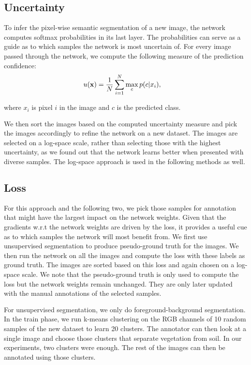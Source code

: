 \documentclass[letterpaper, 10 pt, conference]{ieeeconf}  %
\begin{document}
\subsection{Uncertainty}

To infer the pixel-wise semantic segmentation of a new image, the network computes softmax probabilities in its last layer. The probabilities can serve as a guide as to which samples the network is most uncertain of. For every image passed through the network, we compute the following measure of the prediction confidence:
\begin{align}
u(\bold{x}) &= \frac{1}{N} \sum_{i=1}^N \max_c p(c|x_i),
\end{align}  

where $x_i$ is pixel $i$ in the image and $c$ is the predicted class.

We then sort the images based on the computed uncertainty measure and pick the images accordingly to refine the network on a new dataset. The images are selected on a log-space scale, rather than selecting those with the highest uncertainty, as we found out that the network learns better when presented with diverse samples. The log-space approach is used in the following methods as well.

\subsection{Loss} \label{sec:loss}

For this approach and the following two, we pick those samples for annotation that might have the largest impact on the network weights. Given that the gradients w.r.t the network weights are driven by the loss, it provides a useful cue as to which samples the network will most benefit from. We first use unsupervised segmentation to produce pseudo-ground truth for the images. We then run the network on all the images and compute the loss with these labels as ground truth. The images are sorted based on this loss and again chosen on a log-space scale. We note that the pseudo-ground truth is only used to compute the loss but the network weights remain unchanged. They are only later updated with the manual annotations of the selected samples.

For unsupervised segmentation, we only do foreground-background segmentation. In the train phase, we run k-means clustering on the RGB channels of 10 random samples of the new dataset to learn 20 clusters. The annotator can then look at a single image and choose those clusters that separate vegetation from soil. In our experiments, two clusters were enough. The rest of the images can then be annotated using those clusters. 
\end{document}
